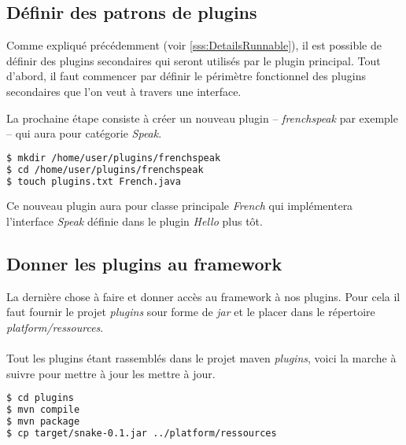 \documentclass[12pt,a4paper]{article}
\begin{document}
\subsection{Définir des patrons de plugins}
Comme expliqué précédemment (voir \ref{sss:DetailsRunnable}), il est possible de 
définir des plugins secondaires qui seront utilisés par le plugin principal. 
Tout d'abord, il faut commencer par définir le périmètre fonctionnel des 
plugins secondaires que l'on veut à travers une interface.

\lstset{language=java,caption=Speak interface for Hello plugin}


La prochaine étape consiste à créer un nouveau plugin -- \emph{frenchspeak} par 
exemple -- qui aura pour catégorie \emph{Speak}.

\begin{lstlisting}[language=bash,caption=Création du plugin secondaire frenchspeak]
$ mkdir /home/user/plugins/frenchspeak
$ cd /home/user/plugins/frenchspeak
$ touch plugins.txt French.java
\end{lstlisting}

Ce nouveau plugin aura pour classe principale \emph{French} qui implémentera 
l'interface \emph{Speak} définie dans le plugin \emph{Hello} plus tôt.
\lstset{language=bash,caption=FrenchSpeak plugin configuration}



\lstset{language=java,caption=FrenchSpeak plugin main class}


\subsection{Donner les plugins au framework}
La dernière chose à faire et donner accès au framework à nos plugins. Pour cela 
il faut fournir le projet \emph{plugins} sour forme de \emph{jar} et le placer 
dans le répertoire \emph{platform/ressources}.
\\\\
Tout les plugins étant rassemblés dans le projet maven \emph{plugins}, voici 
la marche à suivre pour mettre à jour les mettre à jour.

\begin{lstlisting}[language=bash,caption=Mise à jour des plugins]
$ cd plugins
$ mvn compile
$ mvn package
$ cp target/snake-0.1.jar ../platform/ressources
\end{lstlisting}
\end{document}
